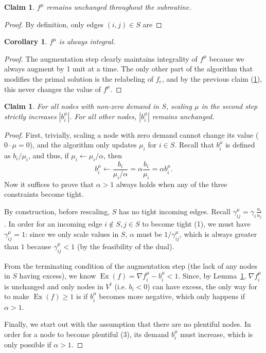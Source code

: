 \documentclass[12pt]{article}
\newtheorem{corollary}{Corollary}[theorem]
\newtheorem{claim}[theorem]{Claim}
\theoremstyle{definition}
\newcommand{\fu}{f^{\mu}}
\newcommand{\nfiu}{\nabla \fu_i}
\newcommand{\biu}{b_{i}^{\mu}}
\newcommand{\giij}{\gamma_{ij}^{\mu}}
\newcommand{\vsrc}{V^{t}}
\DeclareMathOperator{\Ex}{Ex}
\begin{document}
\begin{claim}
$f^{\mu}$ remains unchanged throughout the subroutine.
\label{lem:fsame}
\end{claim} 
\begin{proof}
By definition, only edges $(i,j) \in S$ are 
\end{proof}
\begin{corollary}
$f^{\mu}$ is always integral.
\end{corollary}
\begin{proof}
The augmentation step clearly maintains integrality of $f^{\mu}$ because we
always augment by 1 unit at a time. The only other part of the algorithm that
modifies the primal solution is the relabeling of $f_e$, and by the previous
claim (\ref{lem:fsame}), this never changes the value of $f^{\mu}$.
\end{proof}
\begin{claim}
	For all nodes with non-zero demand in $S$, scaling $\mu$ in the second step
	strictly increases $|\biu|$. For all other nodes, $|\biu|$ remains unchanged.
\end{claim}
\begin{proof}
	First, trivially, scaling a node with zero demand cannot change its value
	($0\cdot\mu=0$), and the algorithm only updates $\mu_i$ for $i \in S$. Recall
	that $\biu$ is defined as $b_i / \mu_i$, and thus, if $\mu_i\leftarrow \mu_i / \alpha$,
	then
	\[ \biu \leftarrow \frac{b_i}{\mu_i / \alpha} = \alpha\frac{b_i}{\mu_i} = \alpha \biu. \] 
	Now it suffices to prove that $\alpha > 1$ always holds when any of the three
	constraints become tight.
	
	By construction, before rescaling, $S$ has no tight
	incoming edges. Recall $\giij = \gamma_i\frac{u_i}{u_j}$. In order for an
	incoming edge $i \notin S, j\in S$ to become tight (1), we must have $\giij=1$:
	since we only scale values in $S$, $\alpha$ must be ${1}/{\giij}$, which is
	always greater than $1$ because $\giij < 1$ (by the feasibility of the dual).

	From the terminating condition of the augmentation step (the lack of any nodes
	in $S$ having excess), we know $\Ex(f) = \nfiu - \biu < 1$. Since, by
	Lemma~\ref{lem:fsame}, $\nfiu$ is unchanged and only nodes in $\vsrc$ (i.e. $b_i<0$)
	can have excess, the only way for to make $\Ex(f) \ge 1$ is if $\biu$ becomes
	more negative, which only happens if $\alpha > 1$. 
	
	Finally, we start out with the assumption that there are no plentiful nodes.
	In order for a node to become plentiful (3), its demand $\biu$ must increase,
	which is only possible if $\alpha > 1$.
\end{proof}
\end{document}
